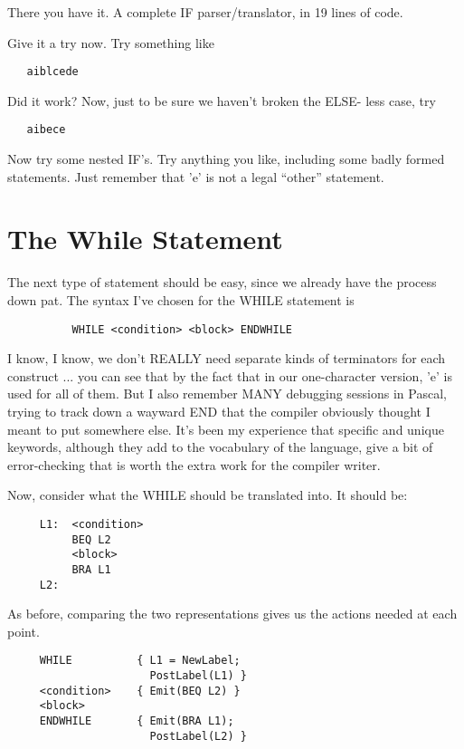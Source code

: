 There you have it. A complete IF parser/translator, in  19 lines of code.

Give it a try now. Try something like

\begin{verbatim}
   aiblcede
\end{verbatim}

Did it work?  Now, just  to  be  sure we haven't broken the ELSE- less case, try

\begin{verbatim}
   aibece
\end{verbatim}

Now try some nested IF's. Try anything you like, including some badly formed statements. Just  remember that 'e' is not a legal ``other'' statement.

\section{The While Statement}

The next type of statement should be easy, since we  already have the process  down  pat. The  syntax  I've chosen for the WHILE statement is

\begin{verbatim}
          WHILE <condition> <block> ENDWHILE
\end{verbatim}

I know, I  know, we  don't  REALLY  need separate kinds of terminators for each construct ... you can see that by the fact that in our one-character version, 'e' is used for all of them. But I also remember  MANY debugging sessions in Pascal, trying to track down a wayward END that the compiler obviously thought I meant to put  somewhere  else. It's been my experience that specific and unique  keywords, although  they add to the  vocabulary  of  the language, give  a  bit of error-checking that is worth the extra work for the compiler writer.

Now, consider  what  the  WHILE  should be translated into. It should be:

\begin{verbatim}
     L1:  <condition>
          BEQ L2
          <block>
          BRA L1
     L2:
\end{verbatim}

As before, comparing the two representations gives us the actions needed at each point.

\begin{verbatim}
     WHILE          { L1 = NewLabel;
                      PostLabel(L1) }
     <condition>    { Emit(BEQ L2) }
     <block>
     ENDWHILE       { Emit(BRA L1);
                      PostLabel(L2) }
\end{verbatim}

